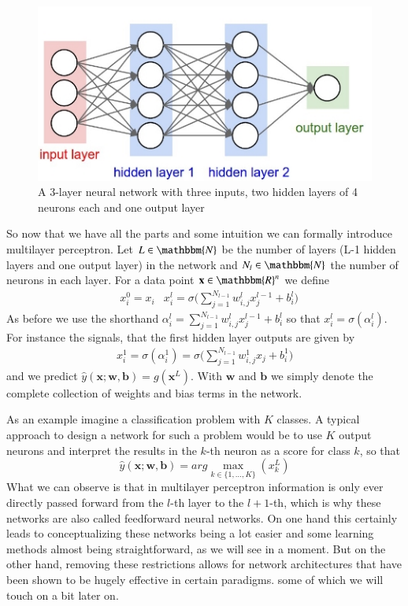 \documentclass[preprint,12pt,3p]{elsarticle}
\begin{document}
\begin{figure}
    \centering
    \includegraphics[scale=1]{figures/ANNs2}
    \caption{A 3-layer neural network with three inputs, two hidden layers of 4 neurons each and one output layer \cite{Xmisc}}
    \label{fig:ANNs2}
\end{figure}

So now that we have all the parts and some intuition we can formally introduce multilayer perceptron. Let $L\in\mathbbm{N}$ be the number of layers (L-1 hidden layers and one output layer) in the network and $N_l\in\mathbbm{N}$ the number of neurons in each layer. For a data point $\mathbf{x}\in\mathbbm{R}^n$ we define
\begin{align*}
    &x^0_i=x_i & x^l_i=\sigma\Big(\sum_{j=1}^{N_{l-1}}w^{l}_{i,j}x^{l-1}_j+b^{l}_i\Big)
\end{align*}
As before we use the shorthand $\alpha^l_i=\sum_{j=1}^{N_{l-1}}w^{l}_{i,j}x^{l-1}_j+b^{l}_i$ so that $x^l_i=\sigma(\alpha^l_i)$. For instance the signals, that the first hidden layer outputs are given by
\begin{align*}
    x^1_i=\sigma(\alpha^1_i)=\sigma\Big(\sum_{j=1}^{N_{l-1}}w^1_{i,j}x_j+b^1_i\Big)
\end{align*}
and we predict $\hat{y}(\mathbf{x};\mathbf{w},\mathbf{b})=g(\mathbf{x}^L)$. With $\mathbf{w}$ and $\mathbf{b}$ we simply denote the complete collection of weights and bias terms in the network. 

As an example imagine a classification problem with $K$ classes. A typical approach to design a network for such a problem would be to use $K$ output neurons and interpret the results in the $k$-th neuron as a score for class $k$, so that 
$$\hat{y}(\mathbf{x};\mathbf{w},\mathbf{b})=arg\max_{k\in\{1,...,K\}}(x_k^L)$$
What we can observe is that in multilayer perceptron information is only ever directly passed forward from the $l$-th layer to the $l+1$-th, which is why these networks are also called feedforward neural networks. On one hand this certainly leads to conceptualizing these networks being a lot easier and some learning methods almost being straightforward, as we will see in a moment. But on the other hand, removing these restrictions allows for network architectures that have been shown to be hugely effective in certain paradigms. some of which we will touch on a bit later on.
\end{document}
